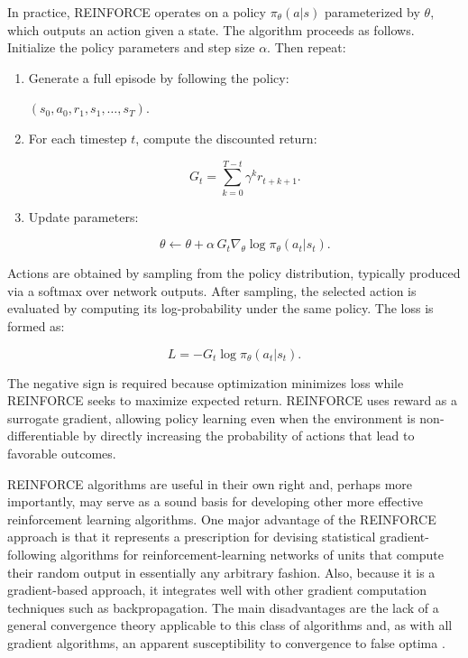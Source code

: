 In practice, REINFORCE operates on a policy $\pi_\theta(a|s)$ parameterized by $\theta$, which outputs an action given a state. The algorithm proceeds as follows. Initialize the policy parameters and step size $\alpha$. Then repeat:


\begin{enumerate}

\item Generate a full episode by following the policy:

$(s_0,a_0,r_1,s_1,\ldots,s_T)$.


\item For each timestep $t$, compute the discounted return:

\[
G_t = \sum_{k=0}^{T-t} \gamma^k r_{t+k+1}.
\]


\item Update parameters:

\[
\theta \leftarrow \theta + \alpha\, G_t \nabla_\theta \log \pi_\theta(a_t|s_t).
\]

\end{enumerate}


Actions are obtained by sampling from the policy distribution, typically produced via a softmax over network outputs. After sampling, the selected action is evaluated by computing its log-probability under the same policy. The loss is formed as:

\[
L = -G_t \log \pi_\theta(a_t|s_t).
\]

The negative sign is required because optimization minimizes loss while REINFORCE seeks to maximize expected return. REINFORCE uses reward as a surrogate gradient, allowing policy learning even when the environment is non-differentiable by directly increasing the probability of actions that lead to favorable outcomes.

REINFORCE algorithms are useful in their own right and, perhaps more importantly, may serve as a sound basis for developing other more effective reinforcement learning algorithms. One major advantage of the REINFORCE approach is that it represents a prescription for devising statistical gradient-following algorithms for reinforcement-learning networks of units that compute their random output in essentially any arbitrary fashion. Also, because it is a gradient-based approach, it integrates well with other gradient computation techniques such as backpropagation. The main disadvantages are the lack of a general convergence theory applicable to this class of algorithms and, as with all gradient algorithms, an apparent susceptibility to convergence to false optima \cite{williamsSimpleStatisticalGradientfollowing1992}.


